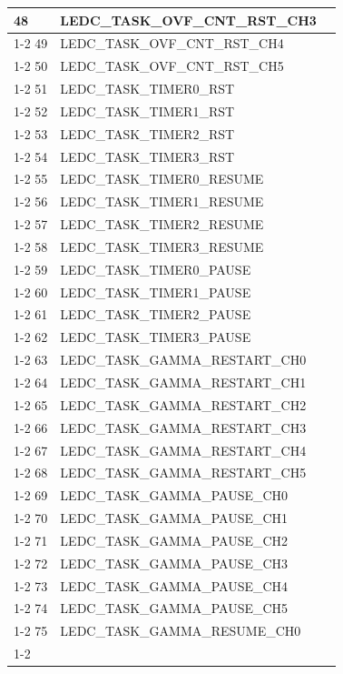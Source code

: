 \documentclass[main\_\_CN.tex]{subfiles}
\begin{document}
\begin{longtable}{ | l | l | l | }
48  & LEDC\_TASK\_OVF\_CNT\_RST\_CH3& \\ \cline{1-2}
49  & LEDC\_TASK\_OVF\_CNT\_RST\_CH4& \\ \cline{1-2}
50  & LEDC\_TASK\_OVF\_CNT\_RST\_CH5& \\ \cline{1-2}
51  & LEDC\_TASK\_TIMER0\_RST  & \\ \cline{1-2}
52  & LEDC\_TASK\_TIMER1\_RST  & \\ \cline{1-2}
53  & LEDC\_TASK\_TIMER2\_RST  & \\ \cline{1-2}
54  & LEDC\_TASK\_TIMER3\_RST  & \\ \cline{1-2}
55  & LEDC\_TASK\_TIMER0\_RESUME    & \\ \cline{1-2}
56  & LEDC\_TASK\_TIMER1\_RESUME    & \\ \cline{1-2}
57  & LEDC\_TASK\_TIMER2\_RESUME    & \\ \cline{1-2}
58  & LEDC\_TASK\_TIMER3\_RESUME    & \\ \cline{1-2}
59  & LEDC\_TASK\_TIMER0\_PAUSE& \\ \cline{1-2}
60  & LEDC\_TASK\_TIMER1\_PAUSE& \\ \cline{1-2}
61  & LEDC\_TASK\_TIMER2\_PAUSE& \\ \cline{1-2}
62  & LEDC\_TASK\_TIMER3\_PAUSE& \\ \cline{1-2}
63  & LEDC\_TASK\_GAMMA\_RESTART\_CH0      & \\ \cline{1-2}
64  & LEDC\_TASK\_GAMMA\_RESTART\_CH1      & \\ \cline{1-2}
65  & LEDC\_TASK\_GAMMA\_RESTART\_CH2      & \\ \cline{1-2}
66  & LEDC\_TASK\_GAMMA\_RESTART\_CH3      & \\ \cline{1-2}
67  & LEDC\_TASK\_GAMMA\_RESTART\_CH4      & \\ \cline{1-2}
68  & LEDC\_TASK\_GAMMA\_RESTART\_CH5      & \\ \cline{1-2}
69  & LEDC\_TASK\_GAMMA\_PAUSE\_CH0 & \\ \cline{1-2}
70  & LEDC\_TASK\_GAMMA\_PAUSE\_CH1 & \\ \cline{1-2}
71  & LEDC\_TASK\_GAMMA\_PAUSE\_CH2 & \\ \cline{1-2}
72  & LEDC\_TASK\_GAMMA\_PAUSE\_CH3 & \\ \cline{1-2}
73  & LEDC\_TASK\_GAMMA\_PAUSE\_CH4 & \\ \cline{1-2}
74  & LEDC\_TASK\_GAMMA\_PAUSE\_CH5 & \\ \cline{1-2}
75  & LEDC\_TASK\_GAMMA\_RESUME\_CH0& \\ \cline{1-2}

\end{longtable}
\end{document}
